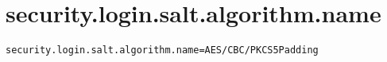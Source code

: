 \section{security.login.salt.algorithm.name}
\label{configuration:SecurityLoginSaltAlgorithmName}
\ClearAPI
\TODO
{}
\begin{lstlisting}[style=Props,caption={Usage example for \textit{security.login.salt.algorithm.name}}]
security.login.salt.algorithm.name=AES/CBC/PKCS5Padding
\end{lstlisting}